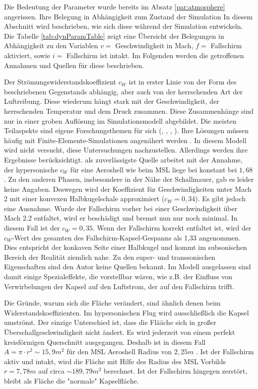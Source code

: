 Die Bedeutung der Parameter wurde bereits im Absatz \ref{par:atmosphere} angerissen. Ihre Belegung in Abhängigkeit zum Zustand der Simulation In diesem Abschnitt wird beschrieben, wie sich diese während der Simulation entwickeln. Die Tabelle \ref{tab:dynParamTable} zeigt eine Übersicht der Belegungen in Abhängigkeit zu den Variablen $v = $ Geschwindigkeit in Mach, $f =$ Fallschirm aktiviert, sowie $i =$ Fallschirm ist intakt. Im Folgenden werden die getroffenen Annahmen und Quellen für diese beschrieben.



Der Strömungswiderstandskoeffizient $c_W$ ist in erster Linie von der Form des beschriebenen Gegenstands abhängig, aber auch von der herrschenden Art der Luftreibung. Diese wiederum hängt stark mit der Geschwindigkeit, der herrschenden Temperatur und dem Druck zusammen. Diese Zusammenhänge sind nur in einer groben Auflösung im Simulationsmodell abgebildet. Die meisten Teilaspekte sind eigene Forschungsthemen für sich (\cite{Blanchard1980}, \cite{Edquist2009}, \cite{Theisinger2009}, \cite{Yamada2009}). Ihre Lösungen müssen häufig mit Finite-Elemente-Simulationen angenähert werden \cite{Edquist2009}. In diesem Modell wird nicht versucht, diese Untersuchungen nachzustellen. Allerdings werden ihre Ergebnisse berücksichtigt. \cite{Wells2000} als zuverlässigste Quelle arbeitet mit der Annahme, der hypersonische $c_W$ für eine Aeroshell wie beim MSL liege bei konstant bei $1,68$. Zu den anderen Phasen, insbesondere in der Nähe der Schallmauer, gab es leider keine Angaben. Deswegen wird der Koeffizient für Geschwindigkeiten unter Mach 2 mit einer konvexen Halbkugelschale approximiert ($c_W = 0,34$). Es gibt jedoch eine Ausnahme. Wurde der Fallschirm vorher bei einer Geschwindigkeit über Mach 2.2 \cite{Way2007} \cite{Edquist2009} entfaltet, wird er beschädigt und bremst nun nur noch minimal. In diesem Fall ist der $c_W = 0,35$. Wenn der Fallschirm korrekt entfaltet ist, wird der $c_W$-Wert des gesamten des Fallschirm-Kapsel-Gespanns als 1,33 angenommen. Dies entspricht der konkaven Seite einer Halbkugel und kommt im subsonischen Bereich der Realität ziemlich nahe. Zu den super- und transsonischen Eigenschaften sind den Autor keine Quellen bekannt. Im Modell ausgelassen sind damit einige Spezialeffekte, die vorstellbar wären, wie z.B. der Einfluss von Verwirbelungen der Kapsel auf den Luftstrom, der auf den Fallschirm trifft.

Die Gründe, warum sich die Fläche verändert, sind ähnlich denen beim Widerstandskoeffizienten. Im hypersonischen Flug wird ausschließlich die Kapsel umströmt. Der einzige Unterschied ist, dass die Flääche sich in großer Überschallgeschwindigkeit nicht ändert. Es wird jederzeit von einem perfekt kreisförmigen Querschnitt ausgegangen. Deshalb ist in diesem Fall $ A = \pi \cdot r^2 \sim 15,9m^2$ für den MSL Aeroshell Radius von $2,25m$ \cite{Edquist2009}. Ist der Fallschirm aktiv und intakt, wird die Fläche mit Hilfe des Radius des MSL Vorbilds $ r = 7,78m $ \cite{NASA/JPL2009} auf circa $\sim 189,79m^2$ berechnet. Ist der Fallschirm hingegen zerstört, bleibt als Fläche die "normale" Kapselfläche.

